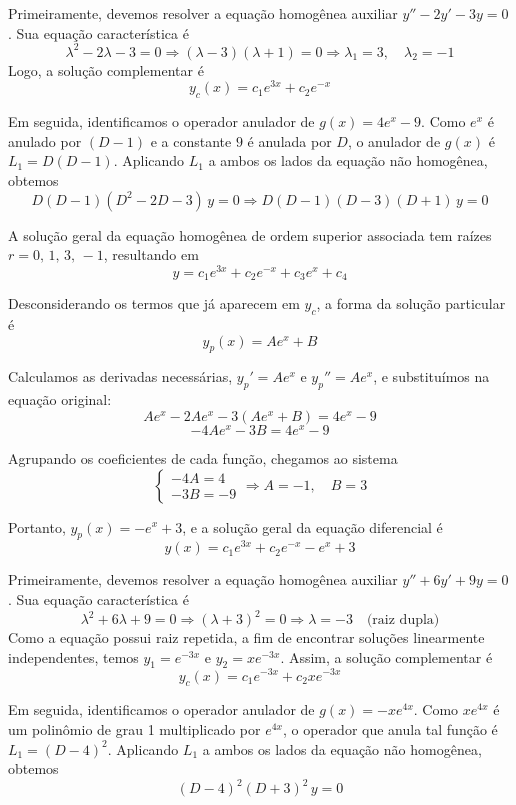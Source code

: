 \documentclass[oneside,12pt,a4paper]{report}
\begin{document}
\begin{resolucao}

    \itemresolucao Primeiramente, devemos resolver a equação homogênea auxiliar $y'' - 2y' - 3y = 0$. Sua equação característica é
    \[\lambda^2 - 2\lambda - 3 = 0 \Rightarrow (\lambda - 3)(\lambda + 1) = 0 \Rightarrow \lambda_1 = 3,\quad \lambda_2 = -1\]
    Logo, a solução complementar é
    \[y_c(x) = c_1 e^{3x} + c_2 e^{-x}\]

    Em seguida, identificamos o operador anulador de $g(x) = 4e^x - 9$. Como $e^x$ é anulado por $(D-1)$ e a constante $9$ é anulada por $D$, o anulador de $g(x)$ é $L_1 = D(D-1)$. Aplicando $L_1$ a ambos os lados da equação não homogênea, obtemos
    \[D(D-1)(D^2-2D-3)\,y = 0 \Rightarrow D(D-1)(D-3)(D+1)\,y = 0\]

    A solução geral da equação homogênea de ordem superior associada tem raízes $r = 0,\, 1,\, 3,\, -1$, resultando em
    \[y = c_1 e^{3x} + c_2 e^{-x} + c_3 e^{x} + c_4\]

    Desconsiderando os termos que já aparecem em $y_c$, a forma da solução particular é
    \[y_p(x) = Ae^x + B\]

    Calculamos as derivadas necessárias, $y_p' = Ae^x$ e $y_p'' = Ae^x$, e substituímos na equação original:
    \[Ae^x - 2Ae^x - 3(Ae^x + B) = 4e^x - 9\]
    \[-4Ae^x - 3B = 4e^x - 9\]

    Agrupando os coeficientes de cada função, chegamos ao sistema
    \[\begin{cases}
        -4A = 4\\
        -3B = -9
    \end{cases}\Rightarrow A = -1,\quad B = 3\]

    Portanto, $y_p(x) = -e^x + 3$, e a solução geral da equação diferencial é
    \[\boxed{y(x) = c_1 e^{3x} + c_2 e^{-x} - e^x + 3}\]

    \itemresolucao Primeiramente, devemos resolver a equação homogênea auxiliar $y'' + 6y' + 9y = 0$. Sua equação característica é
    \[\lambda^2 + 6\lambda + 9 = 0 \Rightarrow (\lambda + 3)^2 = 0 \Rightarrow \lambda = -3\quad \text{(raiz dupla)}\]
    Como a equação possui raiz repetida, a fim de encontrar soluções linearmente independentes, temos $y_1 = e^{-3x}$ e $y_2 = xe^{-3x}$. Assim, a solução complementar é
    \[y_c(x) = c_1 e^{-3x} + c_2 x e^{-3x}\]

    Em seguida, identificamos o operador anulador de $g(x) = -xe^{4x}$. Como $xe^{4x}$ é um polinômio de grau 1 multiplicado por $e^{4x}$, o operador que anula tal função é $L_1 = (D - 4)^2$. Aplicando $L_1$ a ambos os lados da equação não homogênea, obtemos
    \[(D-4)^2(D+3)^2\,y = 0\]


\end{resolucao}
\end{document}
